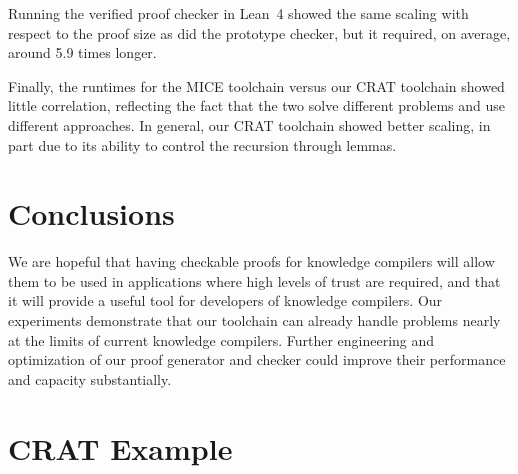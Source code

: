 \documentclass[letterpaper,USenglish,cleveref, autoref, thm-restate]{lipics-v2021}
\newcommand{\pand}{\mathbin{\land^{\sf p}}}
\newcommand{\dependencyset}{{\cal D}}
\newcommand{\modelset}{{\cal M}}
\newcommand{\makenode}[1]{\mathbf{#1}}
\newcommand{\nodeu}{\makenode{u}}
\newcommand{\lean}{Lean~4}
\begin{document}
Running the verified proof checker in \lean{} showed the same scaling
with respect to the proof size as did the prototype checker, but it
required, on average, around 5.9 times longer.

Finally, the runtimes for the MICE toolchain versus our CRAT toolchain
showed little correlation, reflecting the fact that the two solve
different problems and use different approaches.  In general,
our CRAT toolchain showed better scaling, in part due to its ability
to control the recursion through lemmas.

\section{Conclusions}
\label{sect:future}

We are hopeful that having checkable proofs for knowledge compilers
will allow them to be used in applications where high levels of trust
are required, and that it will provide a useful tool for developers of
knowledge compilers.
Our experiments demonstrate that our toolchain can already
 handle problems nearly at the limits of current knowledge compilers.
Further engineering and optimization of our proof
generator and checker could improve their performance and capacity substantially.








\newpage

\appendix

\section{CRAT Example}
\label{app:crat:example}
\end{document}
